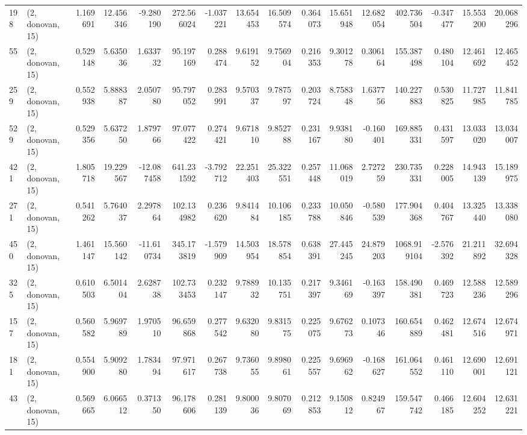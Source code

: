 \begin{tabular}{llrrrrrrrrrrrrrr}
198 &  (2, donovan, 15) &   1.169691 &  12.456346 &  -9.280190 &   272.566024 &  -1.037221 &  13.654453 &  16.509574 &  0.364073 &  15.651948 &  12.682054 &    402.736504 &  -0.347477 &  15.553200 &   20.068296 \\
55  &  (2, donovan, 15) &   0.529148 &   5.635036 &   1.633732 &    95.197169 &   0.288474 &   9.619152 &   9.756904 &  0.216353 &   9.301278 &   0.306164 &    155.387498 &   0.480104 &  12.461692 &   12.465452 \\
259 &  (2, donovan, 15) &   0.552938 &   5.888387 &   2.050780 &    95.797052 &   0.283991 &   9.570337 &   9.787597 &  0.203724 &   8.758348 &   1.637756 &    140.227883 &   0.530825 &  11.727985 &   11.841785 \\
529 &  (2, donovan, 15) &   0.529356 &   5.637250 &   1.879766 &    97.077422 &   0.274421 &   9.671810 &   9.852788 &  0.231167 &   9.938180 &  -0.160401 &    169.885331 &   0.431597 &  13.033020 &   13.034007 \\
421 &  (2, donovan, 15) &   1.805718 &  19.229567 & -12.087458 &   641.231592 &  -3.792712 &  22.251403 &  25.322551 &  0.257448 &  11.068019 &   2.727259 &    230.735331 &   0.228005 &  14.943139 &   15.189975 \\
271 &  (2, donovan, 15) &   0.541262 &   5.764037 &   2.297864 &   102.134982 &   0.236620 &   9.841484 &  10.106185 &  0.233788 &  10.050846 &  -0.580539 &    177.904368 &   0.404767 &  13.325440 &   13.338080 \\
450 &  (2, donovan, 15) &   1.461147 &  15.560142 & -11.610734 &   345.173819 &  -1.579909 &  14.503954 &  18.578854 &  0.638391 &  27.445245 &  24.879203 &   1068.919104 &  -2.576392 &  21.211892 &   32.694328 \\
325 &  (2, donovan, 15) &   0.610503 &   6.501404 &   2.628738 &   102.733453 &   0.232147 &   9.788932 &  10.135751 &  0.217397 &   9.346169 &  -0.163397 &    158.490381 &   0.469723 &  12.588236 &   12.589296 \\
157 &  (2, donovan, 15) &   0.560582 &   5.969789 &   1.970510 &    96.659868 &   0.277542 &   9.632080 &   9.831575 &  0.225075 &   9.676273 &   0.107346 &    160.654889 &   0.462481 &  12.674516 &   12.674971 \\
181 &  (2, donovan, 15) &   0.554900 &   5.909280 &   1.783494 &    97.971617 &   0.267738 &   9.736055 &   9.898061 &  0.225557 &   9.696962 &  -0.168627 &    161.064552 &   0.461110 &  12.690001 &   12.691121 \\
43  &  (2, donovan, 15) &   0.569665 &   6.066512 &   0.371350 &    96.178606 &   0.281139 &   9.800036 &   9.807069 &  0.212853 &   9.150812 &   0.824967 &    159.547742 &   0.466185 &  12.604252 &   12.631221 \\

\end{tabular}
